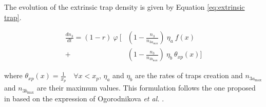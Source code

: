 The evolution of the extrinsic trap density is given by Equation \ref{eq:extrinsic trap}.
 
\begin{equation}
    \begin{split}
        \frac{dn_3}{dt}  = (1-r)\: \varphi\:  \bigg[ & \left(1-\frac{n_3}{n_{3a_\mathrm{max}}}\right) \:\eta_a  \:f(x) \\  + &\left(1-\frac{n_3}{n_{3b_\mathrm{max}}}\right) \:\eta_b  \:\theta_{xp}(x) \bigg]
    \end{split}
    \label{eq:extrinsic trap}
\end{equation}
 
where $\theta_{xp}(x) = \frac{1}{x_p}\quad \forall x < x_p$, $\eta_a$ and $\eta_b$ are the rates of traps creation and ${n_{3a_\mathrm{max}}}$ and ${n_{3b_\mathrm{max}}}$ are their maximum values.
This formulation follows the one proposed in  based on the expression of Ogorodnikova \textit{et al.} .

